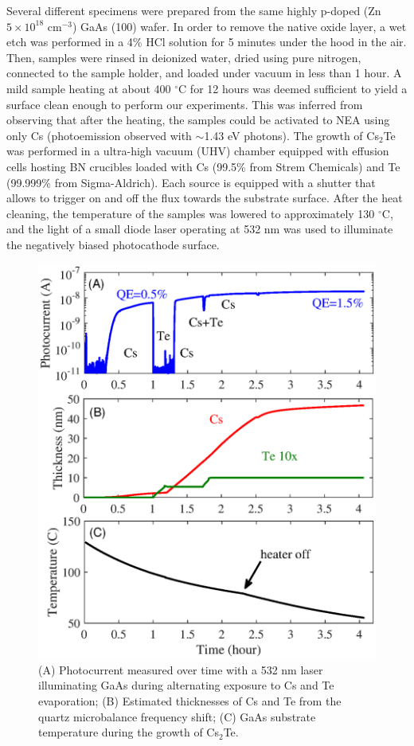 Several different specimens were prepared from the same highly p-doped (Zn $5\times10^{18}$ cm$^{-3}$) GaAs (100) wafer.
In order to remove the native oxide layer, a wet etch was performed in a 4\% HCl solution for 5 minutes under the hood in the air. Then, samples were rinsed in deionized water, dried using pure nitrogen, connected to the sample holder, and loaded under vacuum in less than 1 hour. A mild sample heating at about 400 $^\circ$C for 12 hours was deemed sufficient to yield a surface clean enough to perform our experiments. This was inferred from observing that after the heating, the samples could be activated to NEA using only Cs (photoemission observed with $\sim$1.43 eV photons). 
The growth of Cs$_2$Te was performed in a ultra-high vacuum (UHV) chamber equipped with effusion cells hosting BN crucibles loaded with Cs (99.5\% from Strem Chemicals) and Te (99.999\% from Sigma-Aldrich). Each source is equipped with a shutter that allows to trigger on and off the flux towards the substrate surface. After the heat cleaning, the temperature of the samples was lowered to approximately 130 $^\circ$C, and the light of a small diode laser operating at 532 nm was used to illuminate the negatively biased photocathode surface.
\begin{figure}
    \centering
    \includegraphics[scale=0.56]{figs/CsTe/growth.eps}
    \caption{(A) Photocurrent measured over time with a 532 nm laser illuminating GaAs during alternating exposure to Cs and Te evaporation; (B) Estimated thicknesses of Cs and Te from the quartz microbalance frequency shift; (C) GaAs substrate temperature during the growth of Cs$_2$Te.}
    \label{growth}
\end{figure}
